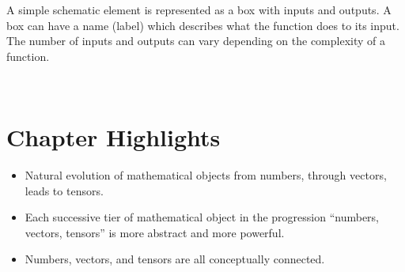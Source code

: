A simple schematic element is represented as a box with inputs
and outputs. A box can have a name (label) which describes what the
function does to its input.  The number of inputs and
outputs can vary depending on the complexity of a function.

\

\vspace{1cm}
\section*{Chapter Highlights}
{\chhc
  \it
\begin{itemize}
\item Natural evolution of mathematical objects from numbers, through
  vectors, leads to tensors.
\item Each successive tier of mathematical object in the progression
  ``numbers, vectors, tensors''  is more abstract and more powerful.
\item Numbers, vectors, and tensors are all conceptually connected.
\end{itemize}
}
